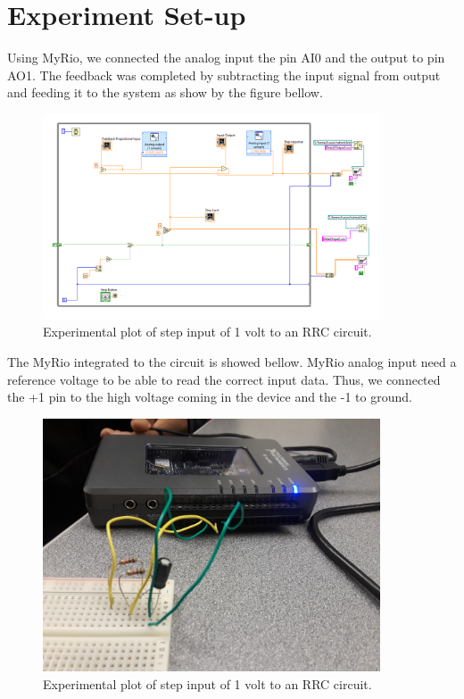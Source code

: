 \documentclass[12pt,letterpaper]{article}
\begin{document}
\section*{Experiment Set-up}
Using MyRio, we connected the analog input the pin AI0 and the output
to pin AO1. The feedback was completed by subtracting the input signal
from output and feeding it to the system as show by the figure bellow.\\
\begin{figure}[h]
    \centering
    \includegraphics[width=10cm]{Capture.png}
    \caption{Experimental plot of step input of 1 volt to an RRC circuit.}
\end{figure}

The MyRio integrated to the circuit is showed bellow. MyRio analog input need 
a reference voltage to be able to read the correct input data. Thus, we connected
the +1 pin to the high voltage coming in the device and the -1 to ground.
\begin{figure}[h]
    \centering
    \includegraphics[width=10cm]{20190224_134224.jpg}
    \caption{Experimental plot of step input of 1 volt to an RRC circuit.}
\end{figure}   
\end{document}

